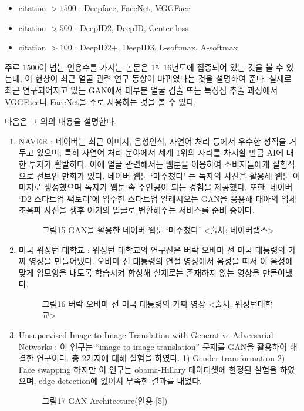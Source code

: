 \documentclass{oblivoir}
\begin{document}
\begin{itemize}
    \item   citation $> 1500$ : Deepface, FaceNet, VGGFace
    \item   citation $> 500$  : DeepID2, DeepID, Center loss
    \item   citation $> 100$  : DeepID2+, DeepID3, L-softmax, A-softmax
\end{itemize}

주로 1500이 넘는 인용수를 가지는 논문은 15~16년도에 집중되어 있는 것을 볼 수 있는데, 이 현상이 최근 얼굴 관련 연구 동향이 바뀌었다는 것을 설명하여 준다. 실제로 최근 연구되어지고 있는 GAN에서 대부분 얼굴 검출 또는 특징점 추출 과정에서 VGGFace나 FaceNet을 주로 사용하는 것을 볼 수 있다. 

다음은 그 외의 내용을 설명한다.
\begin{enumerate}[가.]
    
    \item NAVER : 네이버는 최근 이미지, 음성인식, 자연어 처리 등에서 우수한 성적을 거두고 있으며, 특히 자연어 처리 분야에서 세계 1위의 자리를 차지할 만큼 AI에 대한 투자가 활발하다. 이에 얼굴 관련해서는 웹툰을 이용하여 소비자들에게 실험적으로 선보인 만화가 있다. 네이버 웹툰 ‘마주쳤다’ 는 독자의 사진을 활용해 웹툰 이미지로 생성했으며 독자가 웹툰 속 주인공이 되는 경험을 제공했다. 또한, 네이버 ‘D2 스타트업 팩토리’에 입주한 스타트업 알레시오는 GAN을 응용해 태아의 입체 초음파 사진을 생후 아기의 얼굴로 변환해주는 서비스를 준비 중이다.

    \begin{figure}[h!]
        \centering
        \caption{그림15  GAN을 활용한 네이버 웹툰 ‘마주쳤다’ <출처: 네이버랩스>}
    \end{figure}


    \item 미국 워싱턴 대학교 : 워싱턴 대학교의 연구진은 버락 오바마 전 미국 대통령의 가짜 영상을 만들어냈다. 오바마 전 대통령의 연설 영상에서 음성을 따서 이 음성에 맞게 입모양을 내도록 학습시켜 합성해 실제로는 존재하지 않는 영상을 만들어냈다. 

    \begin{figure}[h!]
        \centering
        \caption{그림16  버락 오바마 전 미국 대통령의 가짜 영상 <출처: 워싱턴대학교>}
    \end{figure}


    \item Unsupervised Image-to-Image Translation with Generative Adversarial Networks : 이 연구는 “image-to-image translation” 문제를 GAN을 활용하여 해결한 연구이다. 총 2가지에 대해 실험을 하였다. 1) Gender transformation 2) Face swapping 하지만 이 연구는 obama-Hillary 데이터셋에 한정된 실험을 하였으며, edge detection에 있어서 부족한 결과를 내었다.
    
    \begin{figure}[h!]
        \centering
        \caption{그림17  GAN Architecture(인용 [5])}
    \end{figure}

\end{enumerate}
\end{document}
